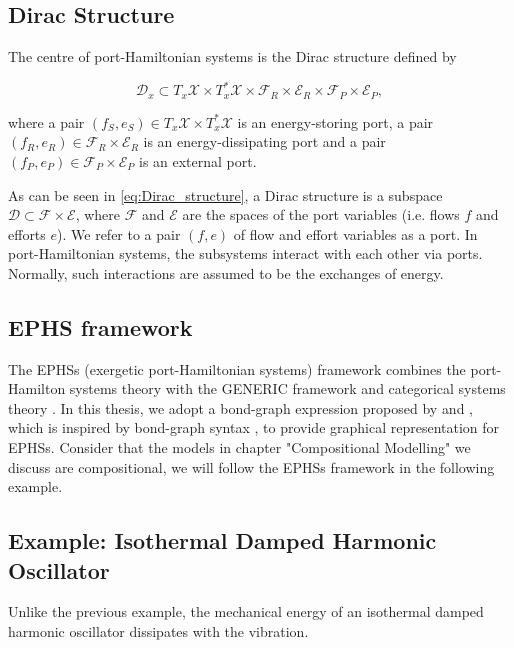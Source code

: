 \documentclass[
	parskip, 			   %
	twoside, 			   %
	DIV=14, 			   %
	BCOR=15.0mm, 		   %
	headsepline, 		   %
	open=right, 		   %
	captions=tableheading, %
	bibliography=totoc,    %
	numbers=noenddot       %
]{scrreprt}
\begin{document}
\subsection{Dirac Structure}
The centre of port-Hamiltonian systems is the Dirac structure defined by

\begin{equation}
    \label{eq:Dirac_structure}
    \mathcal{D}_x \subset T_{x}\mathcal{X} \times T_{x}^{*}\mathcal{X} \times \mathcal{F}_R \times \mathcal{E}_R \times \mathcal{F}_P \times \mathcal{E}_P,
\end{equation}

where a pair $(f_S, e_S) \in T_{x}\mathcal{X} \times T_{x}^{*}\mathcal{X}$ is an energy-storing port, a pair $(f_R, e_R) \in \mathcal{F}_R \times \mathcal{E}_R$ is an energy-dissipating port and a pair $(f_P, e_P) \in \mathcal{F}_P \times \mathcal{E}_P$ is an external port.

As can be seen in \ref{eq:Dirac_structure}, a Dirac structure is a subspace $\mathcal{D} \subset \mathcal{F} \times \mathcal{E}$, where $\mathcal{F}$ and $\mathcal{E}$ are the spaces of the port variables (i.e. flows $f$ and efforts $e$). We refer to a pair $(f,e)$ of flow and effort variables as a port. In port-Hamiltonian systems, the subsystems interact with each other via ports. Normally, such interactions are assumed to be the exchanges of energy.

\subsection{EPHS framework}
The EPHSs (exergetic port-Hamiltonian systems) framework combines the port-Hamilton systems theory with the GENERIC framework and categorical systems theory \cite{lohmayer2021exergetic}. In this thesis, we adopt a bond-graph expression proposed by \cite{lohmayer2022ephs} and \cite{lohmayer2022exergetic}, which is inspired by bond-graph syntax \cite{paynter1961analysis}, to provide graphical representation for EPHSs. Consider that the models in chapter "Compositional Modelling" we discuss are compositional, we will follow the EPHSs framework in the following example.

\subsection{Example: Isothermal Damped Harmonic Oscillator}
Unlike the previous example, the mechanical energy of an isothermal damped harmonic oscillator dissipates with the vibration.
\end{document}
